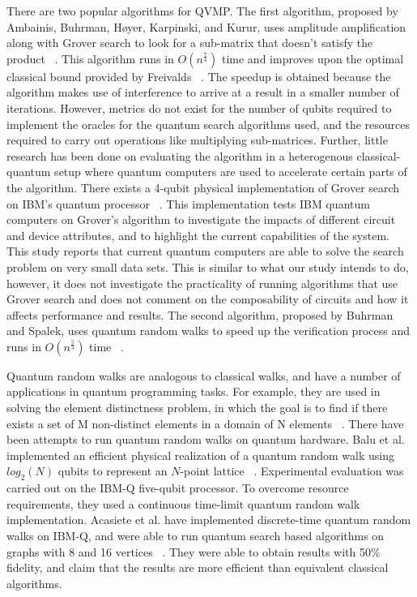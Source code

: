 \documentclass[11pt]{article}
\theoremstyle{definition}
\theoremstyle{remark}
\begin{document}
There are two popular algorithms for QVMP. The first algorithm, proposed by
Ambainis, Buhrman, Høyer, Karpinski, and Kurur, uses amplitude amplification
along with Grover search to look for a sub-matrix that doesn’t satisfy the
product ~\cite{ambainis2002quantummatrix}. This algorithm runs in
$O(n^{\frac{7}{4}})$ time and improves upon the optimal classical bound provided
by Freivalds ~\cite{freivalds1979fast}. The speedup is obtained because the
algorithm makes use of interference to arrive at a result in a smaller number of
iterations. However, metrics do not exist for the number of qubits required to
implement the oracles for the quantum search algorithms used, and the resources
required to carry out operations like multiplying sub-matrices.  Further, little
research has been done on evaluating the algorithm in a heterogenous
classical-quantum setup where quantum computers are used to accelerate certain
parts of the algorithm. There exists a 4-qubit physical implementation of Grover
search on IBM’s quantum processor ~\cite{mandviwalla2018implementing}. This
implementation tests IBM quantum computers on Grover’s algorithm to investigate
the impacts of different circuit and device attributes, and to highlight the
current capabilities of the system.  This study reports that current quantum
computers are able to solve the search problem on very small data sets. This is
similar to what our study intends to do, however, it does not investigate the
practicality of running algorithms that use Grover search and does not comment
on the composability of circuits and how it affects performance and results. The
second algorithm, proposed by Buhrman and Spalek, uses quantum random walks to
speed up the verification process and runs in $O(n^\frac{5}{3})$ time
~\cite{buhrman2005quantum}.

Quantum random walks are analogous to classical walks, and have a number of
applications in quantum programming tasks. For example, they are used in solving
the element distinctness problem, in which the goal is to find if there exists a
set of M non-distinct elements in a domain of N elements
~\cite{ambainis2007quantumwalk}. There have been attempts to run quantum random
walks on quantum hardware. Balu et al.  implemented an efficient physical
realization of a quantum random walk using $log_2(N)$ qubits to represent an
$N$-point lattice ~\cite{balu2018physical}.  Experimental evaluation was
carried out on the IBM-Q five-qubit processor. To overcome resource
requirements, they used a continuous time-limit quantum random walk
implementation. Acasiete et al. have implemented discrete-time quantum random
walks on IBM-Q, and were able to run quantum search based algorithms on graphs
with 8 and 16 vertices ~\cite{acasiete2020implementation}. They were able to
obtain results with 50\% fidelity, and claim that the results are more efficient
than equivalent classical algorithms.
\end{document}
